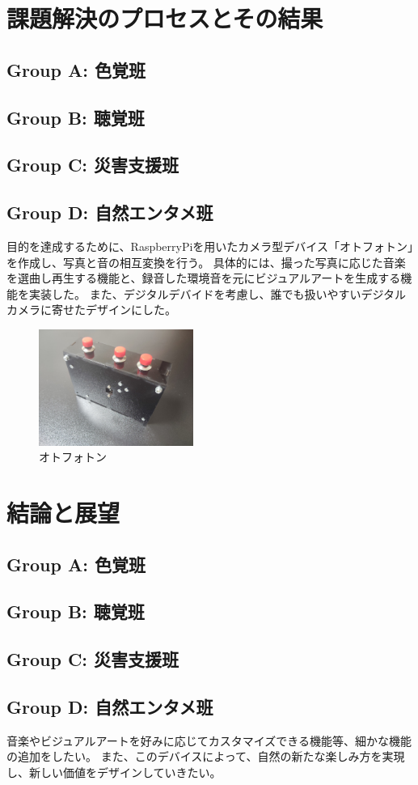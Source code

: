 \section{課題解決のプロセスとその結果}
\subsection{Group A: 色覚班}

\subsection{Group B: 聴覚班}

\subsection{Group C: 災害支援班}

\subsection{Group D: 自然エンタメ班}
目的を達成するために、RaspberryPiを用いたカメラ型デバイス「オトフォトン」を作成し、写真と音の相互変換を行う。
具体的には、撮った写真に応じた音楽を選曲し再生する機能と、録音した環境音を元にビジュアルアートを生成する機能を実装した。
また、デジタルデバイドを考慮し、誰でも扱いやすいデジタルカメラに寄せたデザインにした。

\begin{figure}[h]
  \centering
  \includegraphics[width=0.45\textwidth]{pages/report/images/otophoton.jpg}
  \caption{オトフォトン}
  \label{fig:otophoton}
\end{figure}

\section{結論と展望}
\subsection{Group A: 色覚班}

\subsection{Group B: 聴覚班}

\subsection{Group C: 災害支援班}

\subsection{Group D: 自然エンタメ班}
音楽やビジュアルアートを好みに応じてカスタマイズできる機能等、細かな機能の追加をしたい。
また、このデバイスによって、自然の新たな楽しみ方を実現し、新しい価値をデザインしていきたい。
